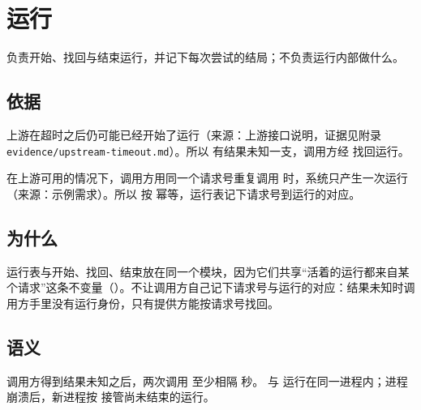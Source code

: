 \section{运行}

负责开始、找回与结束运行，并记下每次尝试的结局；不负责运行内部做什么。

\subsection{依据}

上游在超时之后仍可能已经开始了运行（来源：上游接口说明，证据见附录 \texttt{evidence/upstream-timeout.md}）。所以  有结果未知一支，调用方经  找回运行。

在上游可用的情况下，调用方用同一个请求号重复调用  时，系统只产生一次运行（来源：示例需求）。所以  按  幂等，运行表记下请求号到运行的对应。

\subsection{为什么}

运行表与开始、找回、结束放在同一个模块，因为它们共享“活着的运行都来自某个请求”这条不变量（）。不让调用方自己记下请求号与运行的对应：结果未知时调用方手里没有运行身份，只有提供方能按请求号找回。

\subsection{语义}

调用方得到结果未知之后，两次调用  至少相隔  秒。 与  运行在同一进程内；进程崩溃后，新进程按  接管尚未结束的运行。
